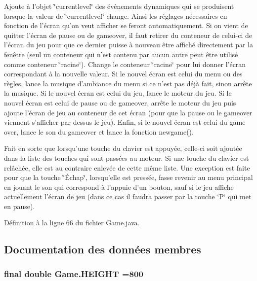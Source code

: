 Ajoute à l'objet \char`\"{}currentlevel\char`\"{} des événements dynamiques qui se produisent lorsque la valeur de \char`\"{}currentlevel\char`\"{} change. Ainsi les réglages nécessaires en fonction de l'écran qu'on veut afficher se feront automatiquement. Si on vient de quitter l'écran de pause ou de gameover, il faut retirer du conteneur de celui-\/ci de l'écran du jeu pour que ce dernier puisse à nouveau être affiché directement par la fenêtre (seul un conteneur qui n'est contenu par aucun autre peut être utilisé comme conteneur \char`\"{}racine\char`\"{}). Change le conteneur \char`\"{}racine\char`\"{} pour lui donner l'écran correspondant à la nouvelle valeur. Si le nouvel écran est celui du menu ou des règles, lance la musique d'ambiance du menu si ce n'est pas déjà fait, sinon arrête la musique. Si le nouvel écran est celui du jeu, lance le moteur du jeu. Si le nouvel écran est celui de pause ou de gameover, arrête le moteur du jeu puis ajoute l'écran de jeu au conteneur de cet écran (pour que la pause ou le gameover viennent s'afficher par-\/dessus le jeu). Enfin, si le nouvel écran est celui du game over, lance le son du gameover et lance la fonction newgame().

Fait en sorte que lorsqu'une touche du clavier est appuyée, celle-\/ci soit ajoutée dans la liste des touches qui sont passées au moteur. Si une touche du clavier est relâchée, elle est au contraire enlevée de cette même liste. Une exception est faite pour que la touche \char`\"{}Échap\char`\"{}, lorsqu'elle est pressée, fasse revenir au menu principal en jouant le son qui correspond à l'appuie d'un bouton, sauf si le jeu affiche actuellement l'écran de jeu (dans ce cas il faudra passer par la touche \char`\"{}\-P\char`\"{} qui met en pause).

Définition à la ligne 66 du fichier Game.\-java.



\subsection{Documentation des données membres}
\hypertarget{class_game_a11eafdb6df55b7fc6ee0e9d3573052d0}{
\subsubsection[{H\-E\-I\-G\-H\-T}]{\setlength{\rightskip}{0pt plus 5cm}final double Game.\-H\-E\-I\-G\-H\-T =800\hspace{0.3cm}{\ttfamily [static]}}}\label{class_game_a11eafdb6df55b7fc6ee0e9d3573052d0}


